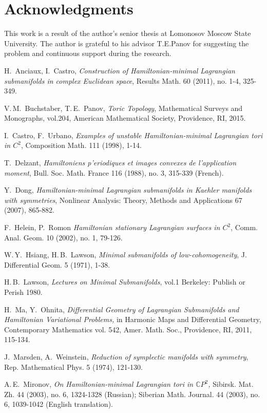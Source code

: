 \documentclass[jsg]{IP_v1_forauthors}
\theoremstyle{definition}
\numberwithin{equation}{section}
\begin{document}
\section*{Acknowledgments}

This work is a result of the author's senior thesis at Lomonosov Moscow State University. The author is  grateful to his advisor T.E.Panov for suggesting the problem and continuous support during the research.

\begin{thebibliography}{16}

H.~Anciaux, I.~Castro, { \it Construction of Hamiltonian-minimal Lagrangian
submanifolds in complex Euclidean space}, Results Math. 60 (2011), no. 1-4, 325-349.

V.\,M.~Buchstaber, T.\,E.~Panov, { \it Toric Topology}, Mathematical Surveys
and Monographs, vol.204, American Mathematical Society, Providence, RI,
2015.

I.~Castro, F.~Urbano, { \it Examples of unstable Hamiltonian-minimal Lagrangian tori in $C^2$}, Composition Math. 111 (1998), 1-14.

T.~Delzant, {\it Hamiltoniens p'eriodiques et images convexes de l'application moment}, Bull. Soc. Math. France 116 (1988), no. 3, 315-339 (French).

Y.~Dong, {\it Hamiltonian-minimal Lagrangian submanifolds in Kaehler manifolds with symmetries}, Nonlinear Analysis: Theory, Methods and Applications 67 (2007), 865-882.

F.~Helein, P.~Romon {\it Hamiltonian stationary Lagrangian surfaces in $C^2$}, Comm. Anal. Geom. 10 (2002), no. 1, 79-126.

W.\,Y.~Hsiang, H.\,B.~Lawson, {\it Minimal submanifolds of low-cohomogeneity}, J. Differential Geom. 5 (1971), 1-38.

H.\,B.~Lawson, { \it Lectures on Minimal Submanifolds}, vol.1 Berkeley: Publish or Perish 1980.

H.~Ma, Y.~Ohnita, { \it Differential Geometry of Lagrangian Submanifolds and
Hamiltonian Variational Problems,} in Harmonic Maps and Differential Geometry, Contemporary Mathematics vol. 542, Amer. Math. Soc., Providence, RI, 2011, 115-134.

J.~Marsden, A.~Weinstein, {\it Reduction of symplectic manifolds with symmetry},
Rep. Mathematical Phys. 5 (1974), 121-130.

A.\,E.~Mironov, { \it On Hamiltonian-minimal Lagrangian tori in $\mathbb{C}P^2$,} Sibirsk. Mat. Zh. 44
(2003), no. 6, 1324-1328 (Russian); Siberian Math. Journal. 44 (2003), no. 6, 1039-1042 (English translation).


\end{thebibliography}
\end{document}
